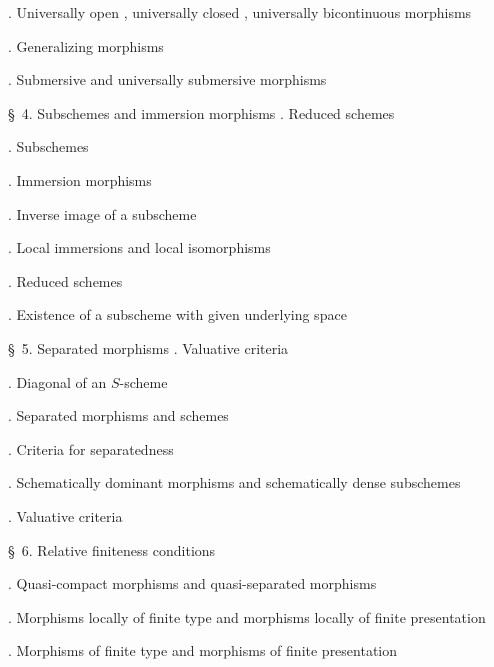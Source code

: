 
\noindent{}. Universally open , universally closed , universally bicontinuous morphisms\dotfill

\noindent{}. Generalizing morphisms\dotfill

\noindent{}. Submersive and universally submersive morphisms

\noindent\quad \S\ 4. Subschemes and immersion morphisms . Reduced schemes\dotfill

\noindent{}. Subschemes\dotfill

\noindent{}. Immersion morphisms\dotfill

\noindent{}. Inverse image of a subscheme\dotfill

\noindent{}. Local immersions and local isomorphisms\dotfill

\noindent{}. Reduced schemes\dotfill

\noindent{}. Existence of a subscheme with given underlying space\dotfill

\noindent\quad \S\ 5. Separated morphisms . Valuative criteria\dotfill

\noindent{}. Diagonal of an $S$-scheme\dotfill

\noindent{}. Separated morphisms and schemes\dotfill

\noindent{}. Criteria for separatedness\dotfill

\noindent{}. Schematically dominant morphisms and schematically dense subschemes\dotfill

\noindent{}. Valuative criteria\dotfill

\noindent\quad \S\ 6. Relative finiteness conditions\dotfill

\noindent{}. Quasi-compact morphisms and quasi-separated morphisms\dotfill

\noindent{}. Morphisms locally of finite type and morphisms locally of finite presentation\dotfill

\noindent{}. Morphisms of finite type and morphisms of finite presentation\dotfill{}

